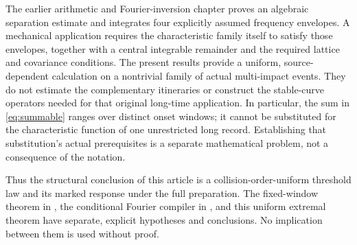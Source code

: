 The earlier arithmetic and Fourier-inversion chapter \cite{A2R33} proves
an algebraic separation estimate and integrates four explicitly assumed
frequency envelopes. A mechanical application requires the characteristic
family itself to satisfy those envelopes, together with a central
integrable remainder and the required lattice and covariance conditions.
The present results provide a uniform, source-dependent calculation on a
nontrivial family of actual multi-impact events. They do not estimate the
complementary itineraries or construct the stable-curve operators needed
for that original long-time application. In particular, the sum in
\eqref{eq:summable} ranges over distinct onset windows; it cannot be
substituted for the characteristic function of one unrestricted long
record. Establishing that substitution's actual prerequisites is a
separate mathematical problem, not a consequence of the notation.

Thus the structural conclusion of this article is a collision-order-uniform
threshold law and its marked response under the full preparation. The
fixed-window theorem in \cite{TC}, the conditional Fourier compiler in
\cite{A2R33}, and this uniform extremal theorem have separate, explicit
hypotheses and conclusions. No implication between them is used without
proof.
